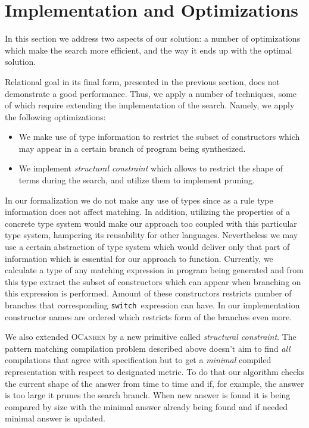 \section{Implementation and Optimizations}
\label{sec:optimization}

In this section we address two aspects of our solution: a number of optimizations which make the search more efficient, and
the way it ends up with the optimal solution.

Relational goal in its final form, presented in the previous section, does not demonstrate a good performance. Thus, we apply a number
of techniques, some of which require extending the implementation of the search. Namely, we apply the following optimizations:

\begin{itemize}
\item We make use of type information to restrict the subset of constructors which may appear in a certain branch of
  program being synthesized.
\item We implement \emph{structural constraint} which allows to restrict the shape of terms during the search, and
  utilize them to implement pruning.  
\end{itemize}

In our formalization we do not make any use of types since as a rule type information does not affect matching. In addition,
utilizing the properties of a concrete type system would make our approach too coupled with this particular type system, hampering
its reusability for other languages. Nevertheless we may use a certain abstraction of type system which would deliver only
that part of information which is essential for our approach to function. Currently, we calculate a type of any matching expression in
program being generated and from this type extract the subset of constructors which can appear when branching on this expression
is performed. Amount of these constructors restricts number of branches that corresponding \lstinline{switch }expression can have. In our implementation constructor names are ordered which restricts form of the branches even more.

We also extended \textsc{OCanren} by a new primitive called \emph{structural constraint}. The pattern matching compilation problem described above doesn't aim to find \emph{all} compilations that agree with specification but to get a \emph{minimal} compiled representation with respect to designated metric. To do that our algorithm checks the current shape of the answer from time to time and if, for example, the answer is too large it prunes the search branch. When new answer is found it is being compared by size with the minimal answer already being found and if needed minimal answer is updated. 

